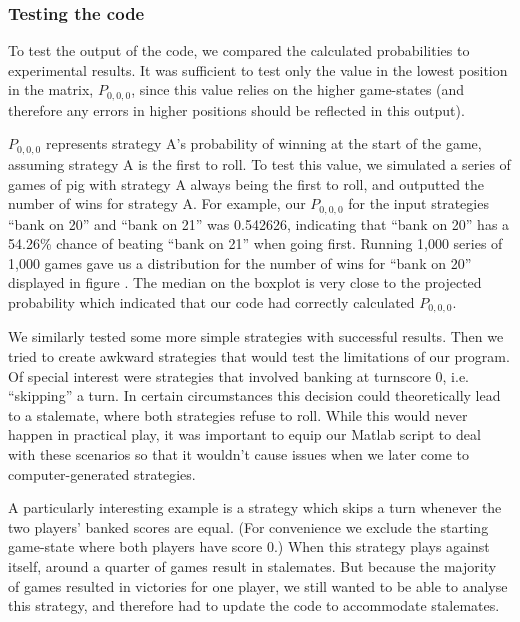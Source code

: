 \documentclass[a4paper,titlepage]{article}
\begin{document}
\subsubsection{Testing the code}


To test the output of the code, we compared the calculated probabilities to experimental results. It was sufficient to test only the value in the lowest position in the matrix, $P_{0,0,0}$, since this value relies on the higher game-states (and therefore any errors in higher positions should be reflected in this output).

$P_{0,0,0}$ represents strategy A's probability of winning at the start of the game, assuming strategy A is the first to roll. To test this value, we simulated a series of games of pig with strategy A always being the first to roll, and outputted the number of wins for strategy A. For example, our $P_{0,0,0}$ for the input strategies ``bank on 20'' and ``bank on 21'' was 0.542626, indicating that ``bank on 20'' has a 54.26\% chance of beating ``bank on 21'' when going first. Running 1,000 series of 1,000 games gave us a distribution for the number of wins for ``bank on 20'' displayed in figure %
. The median on the boxplot is very close to the projected probability which indicated that our code had correctly calculated $P_{0,0,0}$.


We similarly tested some more simple strategies with successful results. Then we tried to create awkward strategies that would test the limitations of our program. Of special interest were strategies that involved banking at turnscore 0, i.e. ``skipping'' a turn. In certain circumstances this decision could theoretically lead to a stalemate, where both strategies refuse to roll. While this would never happen in practical play, it was important to equip our Matlab script to deal with these scenarios so that it wouldn't cause issues when we later come to computer-generated strategies.

A particularly interesting example is a strategy which skips a turn whenever the two players' banked scores are equal. (For convenience we exclude the starting game-state where both players have score 0.) When this strategy plays against itself, around a quarter of games result in stalemates. But because the majority of games resulted in victories for one player, we still wanted to be able to analyse this strategy, and therefore had to update the code to accommodate stalemates.
\end{document}
